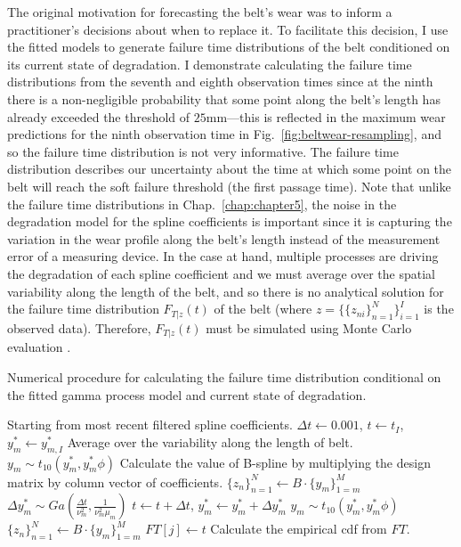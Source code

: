 The original motivation for forecasting the belt's wear was to inform a practitioner's decisions about when to replace it. To facilitate this decision, I use the fitted models to generate failure time distributions of the belt conditioned on its current state of degradation. I demonstrate calculating the failure time distributions from the seventh and eighth observation times since at the ninth there is a non-negligible probability that some point along the belt's length has already exceeded the threshold of $25$mm---this is reflected in the maximum wear predictions for the ninth observation time in Fig.~\ref{fig:beltwear-resampling}, and so the failure time distribution is not very informative. The failure time distribution describes our uncertainty about the time at which some point on the belt will reach the soft failure threshold (the first passage time). Note that unlike the failure time distributions in Chap.~\ref{chap:chapter5}, the noise in the degradation model for the spline coefficients is important since it is capturing the variation in the wear profile along the belt's length instead of the measurement error of a measuring device. In the case at hand, multiple processes are driving the degradation of each spline coefficient and we must average over the spatial variability along the length of the belt, and so there is no analytical solution for the failure time distribution $F_{T|z}(t)$ of the belt (where $z = \{\{z_{ni}\}^N_{n = 1}\}^I_{i = 1}$ is the observed data). Therefore, $F_{T|z}(t)$ must be simulated using Monte Carlo evaluation \citep[p.~504-506]{Meeker2022}.

\begin{algorithm}
	\caption{Numerical procedure for calculating the failure time distribution conditional on the fitted gamma process model and current state of degradation.}
  \label{algo:ftd}
	\begin{algorithmic}[2]
        \State Starting from most recent filtered spline coefficients.
        \State $\Delta t \gets 0.001$, $t \gets t_I$, $y^*_m \gets y^*_{m, I}$
        \State Average over the variability along the length of belt.
        \State $y_m \sim t_{10}\left(y^*_m, y^*_m \phi\right)$
        \State Calculate the value of B-spline by multiplying the design matrix by column vector of coefficients.
        \State $\{z_n\}^N_{n = 1} \gets B \cdot \{y_m\}^M_{1 = m}$
          \State $\Delta y^*_m \sim Ga\left(\frac{\Delta t}{\nu_m^2}, \frac{1}{\nu_m^2 \mu_m}\right)$
          \State $t \gets t + \Delta t$, $y^*_m \gets y^*_m + \Delta y^*_m$
          \State $y_m \sim t_{10}\left(y^*_m, y^*_m \phi\right)$
          \State $\{z_n\}^N_{n = 1} \gets B \cdot \{y_m\}^M_{1 = m}$
        \EndWhile
        \State $FT[j] \gets t$
      \EndFor
      \State Calculate the empirical cdf from $FT$.
    \EndFor
	\end{algorithmic} 
\end{algorithm} 

